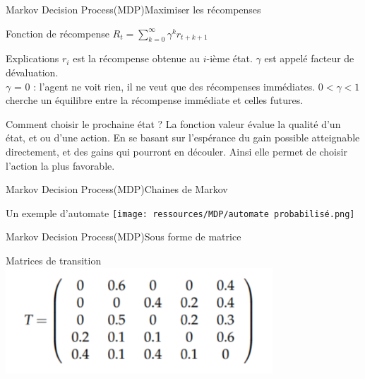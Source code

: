 \begin{frame}{Markov Decision Process(MDP)}{Maximiser les récompenses}
	\begin{center}
		
		\begin{block}{Fonction de récompense}
            \centering
			$R_t = \sum^{\infty}_{k=0}\gamma^{k}r_{t+k+1}$
		\end{block}
		\begin{block}{Explications}
			$r_{i}$ est la récompense obtenue au $i$-ième état.
			$\gamma$ est appelé facteur de dévaluation.\\
			$\gamma$ = 0 : l'agent ne voit rien, il ne veut que des récompenses immédiates.
			$0< \gamma <1$ cherche un équilibre entre la récompense immédiate et celles futures.
		\end{block}
		\begin{block}{Comment choisir le prochaine état ?}
			La fonction valeur évalue la qualité d’un état, et ou d’une action. En se basant sur l’espérance du gain possible atteignable directement, et des gains qui pourront en découler. Ainsi elle permet de choisir l’action la plus favorable.
		\end{block}
	\end{center}
\end{frame}
\begin{frame}{Markov Decision Process(MDP)}{Chaines de Markov}
	\begin{center}
		
		\begin{center}{Un exemple d'automate}
			\texttt{[image: ressources/MDP/automate probabilisé.png]}
		\end{center}
	\end{center}
\end{frame}
\begin{frame}{Markov Decision Process(MDP)}{Sous forme de matrice}
	\begin{center}
		\begin{center}{Matrices de transition}
			\includegraphics[width=10cm]{ressources/MDP/Matrice de transitions.png}
		\end{center}
	\end{center}
\end{frame}
